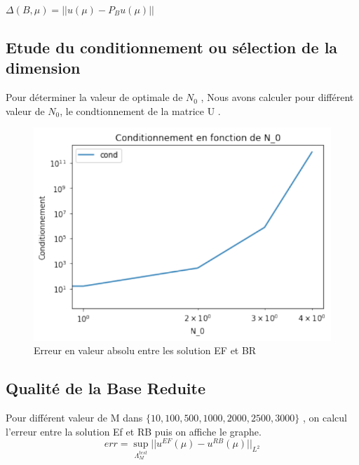\documentclass[12pt]{article}
\begin{document}
$
\Delta(B,\mu) =|| u(\mu) - P_{B}u(\mu)||
$






\subsection{Etude du conditionnement ou sélection de la dimension}
Pour déterminer la valeur de optimale de $N_0$ , Nous avons calculer pour différent valeur de $N_0$, le condtionnement de la matrice 
U .

\begin{figure}
\begin{center}
\includegraphics[scale=1]{cond.pdf}
\caption[]{Erreur en valeur absolu entre les solution EF et BR }
\end{center}
\end{figure}


\subsection{Qualité de la Base Reduite}

Pour différent valeur de M dans $\{ 10,100,500,1000,2000,2500,3000 \}$ , on calcul l'erreur entre la solution Ef et RB puis on affiche le graphe. 
$$
err = \underset{\Lambda ^{test}_{M}}{\sup} {||u^{EF}(\mu) - u^{RB}(\mu) ||_{L^{2}} }
$$
\end{document}
